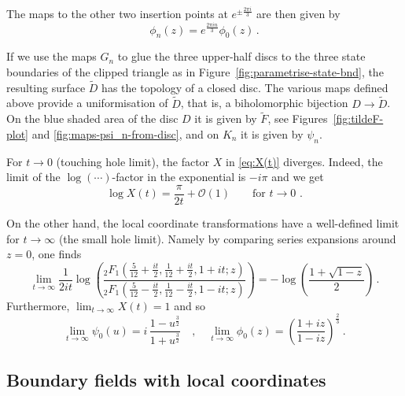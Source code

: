\documentclass[11pt,a4paper]{article}
\numberwithin{equation}{section}
\begin{document}
\noindent 
The maps to the other two insertion points at $e^{\pm\frac{2\pi i}{3}}$ are then given by
%
\begin{equation}
    \phi_n(z) = e^{\frac{2\pi i n}{3}} \phi_0(z) \,.
\end{equation}


\medskip

If we use the maps $G_n$ to glue the three upper-half discs to the three state boundaries of the clipped triangle as in Figure~\ref{fig:parametrise-state-bnd}, the resulting surface $\widetilde D$ has the topology of a closed disc. The various maps defined above provide a uniformisation of $\widetilde D$, that is, a biholomorphic 
bijection $D \to  \widetilde D$. On the blue shaded area of the disc $D$ it is given by $\tilde F$, see Figures~\ref{fig:tildeF-plot} and \ref{fig:maps-psi_n-from-disc}, and on $K_n$ it is given by $\psi_n$.

\medskip
For $t \to 0$ (touching hole limit), the factor $X$ in \eqref{eq:X(t)} diverges. Indeed, the limit of the $\log(\cdots)$-factor in the exponential is $- i \pi$ and we get
\begin{equation}\label{eq:X-t0-limit}
    \log X(t) = \frac{\pi}{2t} + \mathcal{O}(1) 
    \qquad
    \text{for $t \to 0$ .}
\end{equation}

\noindent
On the other hand,
the local coordinate transformations have a well-defined limit for $t \to \infty$ (the small hole limit). Namely by comparing series expansions around $z=0$, one finds 
%
\begin{equation}\label{eq:logFF-limit}
    \lim_{t \to \infty} 
    \frac{1}{2 i t} \log\!\left( \frac{_2F_1\left(\frac{5}{12}+\frac{it}2,\frac{1}{12}+\frac{i t}2,1+i t; z\right)}{_2F_1\left(\frac{5}{12}-\frac{i t}2,\frac{1}{12}-\frac{i t}2,1-i t; z\right)}\right)
    =
    - \log\!\left(\frac{1+\sqrt{1-z}}2\right)\,.
\end{equation}
Furthermore, $\lim_{t \to \infty} X(t) = 1$ and so
\begin{equation}\label{eq:psiphi-limit}
    \lim_{t \to \infty} \psi_0(u) 
    = i\, \frac{1-u^{\frac32}}{1+u^{\frac32}}
\quad , \quad    
    \lim_{t \to \infty} \phi_0(z) =  \left(\frac{1+iz}{1-iz}\right)^{\frac23}
    ~.
\end{equation}

\subsection{Boundary fields with local coordinates}\label{sec:bfields}
\end{document}
